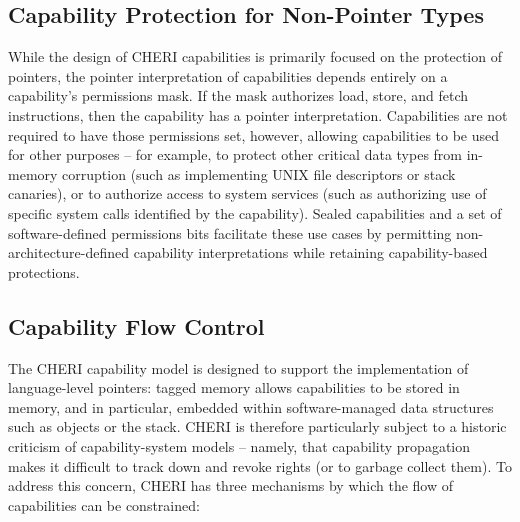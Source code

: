 \subsection{Capability Protection for Non-Pointer Types}

While the design of CHERI capabilities is primarily focused on the protection
of pointers, the pointer interpretation of capabilities depends entirely on
a capability's permissions mask.
If the mask authorizes load, store, and fetch instructions, then the
capability has a pointer interpretation.
Capabilities are not required to have those permissions set, however, allowing
capabilities to be used for other purposes -- for example, to protect other
critical data types from in-memory corruption (such as implementing UNIX file
descriptors or stack canaries), or to authorize access to system services
(such as authorizing use of specific system calls identified by the
capability).
Sealed capabilities and a set of software-defined permissions bits facilitate
these use cases by permitting non-architecture-defined capability
interpretations while retaining capability-based protections.

\subsection{Capability Flow Control}
\label{sec:model-capability-control-flow}

The CHERI capability model is designed to support the implementation of
language-level pointers: tagged memory allows capabilities to be stored in
memory, and in particular, embedded within software-managed data structures
such as objects or the stack.
CHERI is therefore particularly subject to a historic criticism of
capability-system models -- namely,
that capability propagation makes it difficult to track
down and revoke rights (or to garbage collect them).
To address this concern, CHERI has three mechanisms by which the flow of
capabilities can be constrained:

